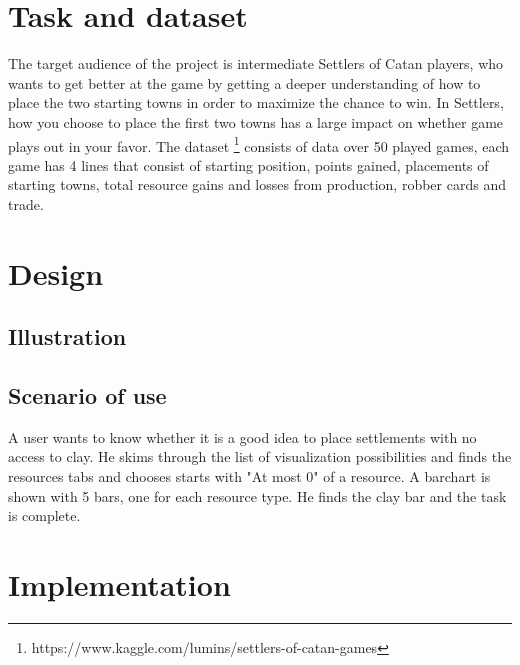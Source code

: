 \documentclass{article}
\begin{document}
\section{Task and dataset}

The target audience of the project is intermediate Settlers of Catan
players, who wants to get better at the game by getting a deeper understanding
of how to place the two starting towns in order to maximize the chance
to win. In Settlers, how you choose to place the first two towns has
a large impact on whether game plays out in your favor. The dataset
\footnote{https://www.kaggle.com/lumins/settlers-of-catan-games} consists of
data over 50 played games, each game has 4 lines that consist of starting
position, points gained, placements of starting towns, total resource gains
and losses from production, robber cards and trade.

\section{Design}

\subsection{Illustration}



\subsection{Scenario of use}

A user wants to know whether it is a good idea to place settlements with no
access to clay. He skims through the list of visualization possibilities
and finds the resources tabs and chooses starts with "At most 0" of a
resource. A barchart is shown with 5 bars, one for each resource type. He
finds the clay bar and the task is complete.

\section{Implementation}
\end{document}
